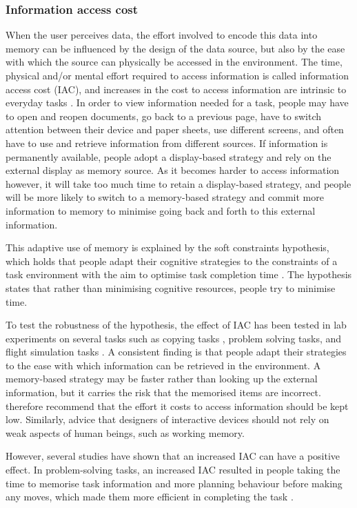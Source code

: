 \documentclass[11pt,oneside]{report}
\begin{document}
\subsubsection{Information access cost}
When the user perceives data, the effort involved to encode this data into memory can be influenced by the design of the data source, but also by the ease with which the source can physically be accessed in the environment. The time, physical and/or mental effort required to access information is called information access cost (IAC), and increases in the cost to access information are intrinsic to everyday tasks \citep{Morgan2009, Waldron2011}. In order to view information needed for a task, people may have to open and reopen documents, go back to a previous page, have to switch attention between their device and paper sheets, use different screens, and often have to use and retrieve information from different sources. If information is permanently available, people adopt a display-based strategy and rely on the external display as memory source. As it becomes harder to access information however, it will take too much time to retain a display-based strategy, and people will be more likely to switch to a memory-based strategy and commit more information to memory to minimise going back and forth to this external information.

This adaptive use of memory is explained by the soft constraints hypothesis, which holds that people adapt their cognitive strategies to the constraints of a task environment with the aim to optimise task completion time \citep{Gray2006}. The hypothesis states that rather than minimising cognitive resources, people try to minimise time. 

To test the robustness of the hypothesis, the effect of IAC has been tested in lab experiments on several tasks such as copying tasks \citep[e.g.][]{Gray2006}, problem solving tasks\citep[e.g.][]{Morgan2012}, and flight simulation tasks \citep{Waldron2007}. A consistent finding is that people adapt their strategies to the ease with which information can be retrieved in the environment.  A memory-based strategy may be faster rather than looking up the external information, but it carries the risk that the memorised items are incorrect. \citet{Gray2006} therefore recommend that the effort it costs to access information should be kept low. Similarly, \citet{Kohn2000} advice that designers of interactive devices should not rely on weak aspects of human beings, such as working memory.

However, several studies have shown that an increased IAC can have a positive effect. In problem-solving tasks, an increased IAC resulted in people taking the time to memorise task information and more planning behaviour before making any moves, which made them more efficient in completing the task \citep[e.g.][]{Morgan2007, Morgan2012}. 
\end{document}
